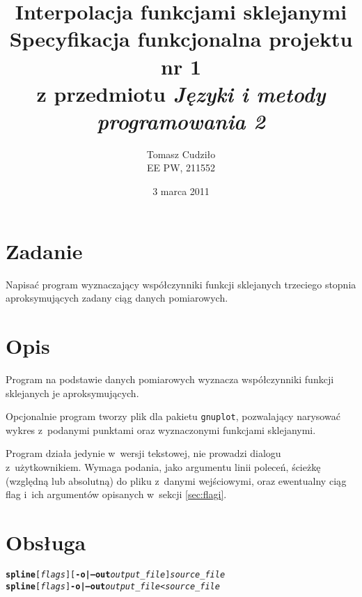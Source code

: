 \documentclass[10pt,a4paper]{article}
\newcommand{\prog}[1]{\texttt{#1}}
\newcommand{\flag}[1]{\textbf{\prog{#1}}}
\begin{document}
\title{ 
  Interpolacja funkcjami sklejanymi\\
  {\normalsize Specyfikacja funkcjonalna projektu nr 1}\\\vspace{-12pt}
  {\normalsize z przedmiotu \emph{Języki i metody programowania 2}}
}
\author{
  Tomasz Cudziło\\
  {\small EE PW, 211552}
}
\date{3 marca 2011}
\maketitle

\section*{Zadanie}
\label{sec:zadanie}

Napisać program wyznaczający współczynniki funkcji sklejanych trzeciego stopnia
aproksymujących zadany ciąg danych pomiarowych.

\vspace{24pt}

\section{Opis}
\label{sec:opis}

Program na podstawie danych pomiarowych wyznacza współczynniki funkcji
sklejanych je aproksymujących.

Opcjonalnie program tworzy plik dla pakietu \prog{gnuplot}, pozwalający
narysować wykres z~podanymi punktami oraz wyznaczonymi funkcjami sklejanymi.

Program działa jedynie w~wersji tekstowej, nie prowadzi dialogu
z~użytkownikiem. Wymaga podania, jako argumentu linii poleceń, ścieżkę
(względną lub absolutną) do pliku z~danymi wejściowymi, oraz ewentualny ciąg
flag i~ich argumentów opisanych w~sekcji \ref{sec:flagi}.

\section{Obsługa}

\begin{alltt}
\textbf{spline} [\textsl{flags}] [\flag{-o|--out} \textsl{output\_file}] \textsl{source\_file}
\textbf{spline} [\textsl{flags}] \flag{-o|--out} \textsl{output\_file} < \textsl{source\_file}
\end{alltt}
\end{document}
